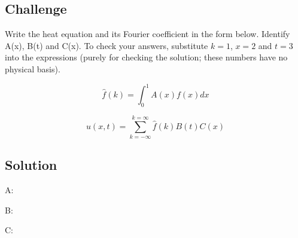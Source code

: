 \subsection*{Challenge}
Write the heat equation and its Fourier coefficient in the form below. Identify A(x), B(t) and C(x). To check your answers, substitute $k=1$, $x=2$ and $t=3$ into the expressions (purely for checking the solution; these numbers have no physical basis).

\begin{equation}
    \hat{f}(k) = \int_0^1 A(x) f(x) dx
\end{equation}

\begin{equation}
    u(x,t) = \sum_{k=-\infty}^{k=\infty} \hat{f}(k) B(t) C(x)
\end{equation}

\subsection*{Solution}
A: 

B: 

C: 




%
%
%




